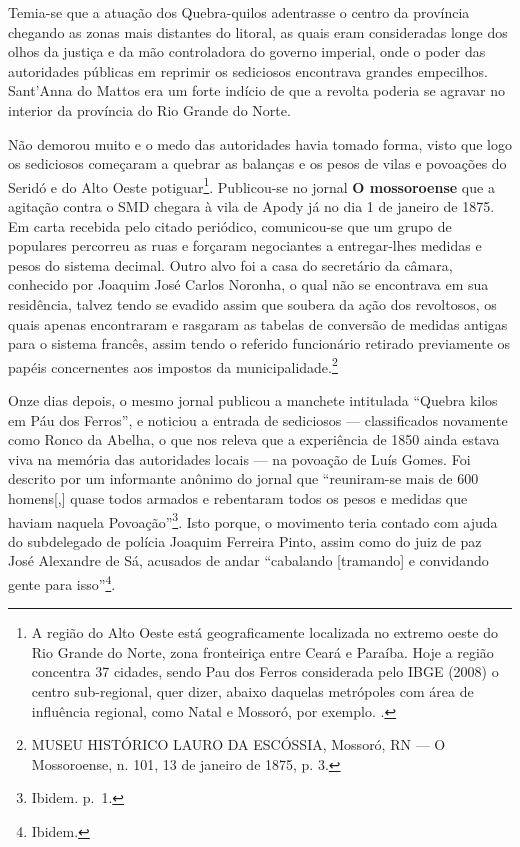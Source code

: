 \begin{refsection}
Temia-se que a atuação dos Quebra-quilos adentrasse o centro da província chegando as zonas mais distantes do litoral, as quais eram consideradas longe dos olhos da justiça e da mão controladora do governo imperial, onde o poder das autoridades públicas em reprimir os sediciosos encontrava grandes empecilhos. Sant’Anna do Mattos era um forte indício de que a revolta poderia se agravar no interior da província do Rio Grande do Norte.  

Não demorou muito e o medo das autoridades havia tomado forma, visto que logo os sediciosos começaram a quebrar as balanças e os pesos de vilas e povoações do Seridó e do Alto Oeste potiguar\footnote{A região do Alto Oeste está geograficamente localizada no extremo oeste do Rio Grande do Norte, zona fronteiriça entre Ceará e Paraíba. Hoje a região concentra 37 cidades, sendo Pau dos Ferros considerada pelo IBGE (2008) o centro sub-regional, quer dizer, abaixo daquelas metrópoles com área de influência regional, como Natal e Mossoró, por exemplo. \cite{DantasAndSilva2011}.}. Publicou-se no jornal \textbf{O mossoroense} que a agitação contra o SMD chegara à vila de Apody já no dia 1 de janeiro de 1875. Em carta recebida pelo citado periódico, comunicou-se que um grupo de populares percorreu as ruas e forçaram negociantes a entregar-lhes medidas e pesos do sistema decimal. Outro alvo foi a casa do secretário da câmara, conhecido por Joaquim José Carlos Noronha, o qual não se encontrava em sua residência, talvez tendo se evadido assim que soubera da ação dos revoltosos, os quais apenas encontraram e rasgaram as tabelas de conversão de medidas antigas para o sistema francês, assim tendo o referido funcionário retirado previamente os papéis concernentes aos impostos da municipalidade.\footnote{MUSEU HISTÓRICO LAURO DA ESCÓSSIA, Mossoró, RN --- O Mossoroense, n. 101, 13 de janeiro de 1875, p. 3.}  

Onze dias depois, o mesmo jornal publicou a manchete intitulada “Quebra kilos em Páu dos Ferros”, e noticiou a entrada de sediciosos --- classificados novamente como Ronco da Abelha, o que nos releva que a experiência de 1850 ainda estava viva na memória das autoridades locais --- na povoação de Luís Gomes. Foi descrito por um informante anônimo do jornal que “reuniram-se mais de 600 homens[,] quase todos armados e rebentaram todos os pesos e medidas que haviam naquela Povoação”\footnote{Ibidem. p.~1.}. Isto porque, o movimento teria contado com ajuda do subdelegado de polícia Joaquim Ferreira Pinto, assim como do juiz de paz José Alexandre de Sá, acusados de andar “cabalando [tramando] e convidando gente para isso”\footnote{Ibidem.}.


\end{refsection}
